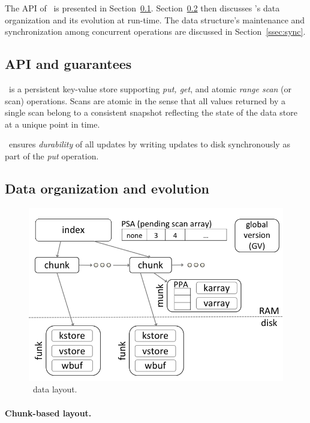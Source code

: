 

The API of \sys\ is presented in Section~\ref{ssec:api}. Section~\ref{ssec:layout} then discusses \sys's data 
organization and its evolution at run-time. The data structure's maintenance and 
synchronization among concurrent operations are discussed in Section~\ref{ssec:sync}.

\subsection{API and guarantees}
\label{ssec:api}

\sys\ is a persistent key-value store supporting \emph{put, get}, and atomic \emph{range scan} (or scan) operations. 
Scans are atomic in the sense that all values returned by a single scan belong to a consistent snapshot reflecting
the state of the data store at a unique point in time.


\sys\ ensures \emph{durability} of all updates by writing updates to disk synchronously as part of the \emph{put} operation.

\subsection{Data organization and evolution}
\label{ssec:layout}

\begin{figure}[htb]
\centerline{
\includegraphics[width=\columnwidth]{PiWi.png}
}
\caption{\sys\ data layout.}
\label{fig:layout}
\end{figure}

\paragraph{Chunk-based layout.}

